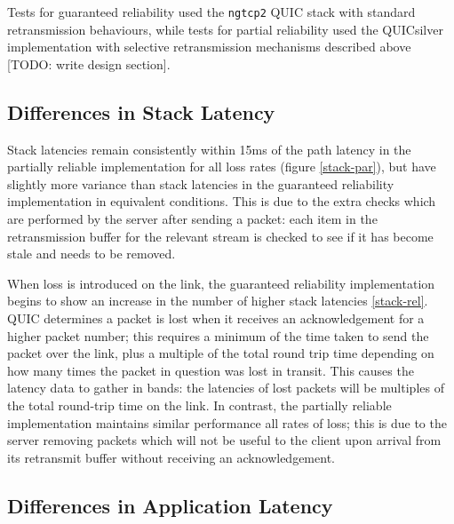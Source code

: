 \documentclass{mpaper}
\begin{document}
Tests for guaranteed reliability used the \texttt{ngtcp2} QUIC stack with standard retransmission behaviours, while tests for partial reliability used the QUICsilver implementation with selective retransmission mechanisms described above [TODO: write design section].

\subsection{Differences in Stack Latency}

Stack latencies remain consistently within 15ms of the path latency in the partially reliable implementation for all loss rates (figure \ref{stack-par}), but have slightly more variance than stack latencies in the guaranteed reliability implementation in equivalent conditions. This is due to the extra checks which are performed by the server after sending a packet: each item in the retransmission buffer for the relevant stream is checked to see if it has become stale and needs to be removed.

When loss is introduced on the link, the guaranteed reliability implementation begins to show an increase in the number of higher stack latencies \ref{stack-rel}. QUIC determines a packet is lost when it receives an acknowledgement for a higher packet number; this requires a minimum of the time taken to send the packet over the link, plus a multiple of the total round trip time depending on how many times the packet in question was lost in transit. This causes the latency data to gather in bands: the latencies of lost packets will be multiples of the total round-trip time on the link. In contrast, the partially reliable implementation maintains similar performance all rates of loss; this is due to the server removing packets which will not be useful to the client upon arrival from its retransmit buffer without receiving an acknowledgement.

\subsection{Differences in Application Latency}
\end{document}
